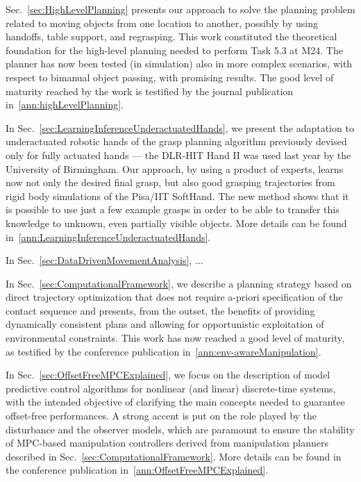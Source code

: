 \documentclass[a4paper,11pt,pdf]{pacmanreport}
\begin{document}
Sec.~\ref{sec:HighLevelPlanning} presents our approach to solve the planning problem related to moving objects from one location to another, possibly by using handoffs, table support, and regrasping. This work constituted the theoretical foundation for the high-level planning needed to perform Task 5.3 at M24. The planner has now been tested (in simulation) also in more complex scenarios, with respect to bimanual object passing, with promising results.
The good level of maturity reached by the work is testified by the journal publication in~\ref{ann:highLevelPlanning}.

In Sec.~\ref{sec:LearningInferenceUnderactuatedHands}, we present the adaptation to underactuated robotic hands of the grasp planning algorithm previously devised only for fully actuated hands --- the DLR-HIT Hand II was used last year by the University of Birmingham. Our approach, by using a product of experts, learns now not only the desired final grasp, but also good grasping trajectories from rigid body simulations of the Pisa/IIT SoftHand. The new method shows that it is possible to use just a few example grasps in order to be able to transfer this knowledge to unknown, even partially visible objects. More details can be found in~\ref{ann:LearningInferenceUnderactuatedHands}.

In Sec.~\ref{sec:DataDrivenMovementAnalysis}, ...



In Sec.~\ref{sec:ComputationalFramework}, we describe a planning strategy based on direct trajectory optimization that does not require a-priori specification of the contact sequence and presents, from the outset, the benefits of providing dynamically consistent plans and allowing for opportunistic exploitation of environmental constraints. This work has now reached a good level of maturity, as testified by the conference publication in~\ref{ann:env-awareManipulation}.

In Sec.~\ref{sec:OffsetFreeMPCExplained}, we focus on the description of model predictive control algorithms for nonlinear (and linear) discrete-time systems, with the intended objective of clarifying the main concepts needed to guarantee offset-free performances. A strong accent is put on the role played by the disturbance and the observer models, which are paramount to ensure the stability of MPC-based manipulation controllers derived from manipulation planners described in Sec.~\ref{sec:ComputationalFramework}.
 More details can be found in the conference publication in~\ref{ann:OffsetFreeMPCExplained}.
\end{document}
